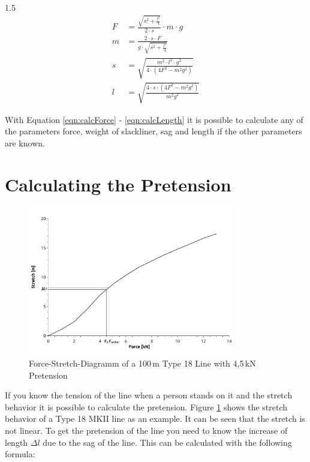 \begin{spreadlines}{1.5\baselineskip}
\begin{align}
	F &= \frac{\sqrt{s^2 + \frac{l^2}{4}}}{2\cdot s} \cdot m\cdot g \label{eqn:calcForce} \\
	m &= \frac{2\cdot s\cdot F}{g\cdot\sqrt{s^2 + \frac{l^2}{4}}} \label{eqn:calcWeight} \\
	s &= \sqrt{ \frac{m^2\cdot l^2\cdot g^2}{4\cdot(4F^2 - m^2g^2)} } \label{eqn:calSag} \\
	l &= \sqrt{ \frac{4\cdot s\cdot (4F^2 - m^2g^2)}{m^2g^2} } \label{eqn:calcLength} 
\end{align}
\end{spreadlines}

With Equation \ref{eqn:calcForce} - \ref{eqn:calcLength} it is possible to calculate any of the parameters force, weight of slackliner, sag and length if the other parameters are known.

\section{Calculating the Pretension}

\begin{figure}[htb] \centering
	\includegraphics[width=0.8\textwidth]{images/forceStretchDiagram.pdf}
	\caption{Force-Stretch-Diagramm of a 100\,m Type 18 Line with 4,5\,kN Pretension}
	\label{fig:forceStretchDiagramm}
\end{figure}

If you know the tension of the line when a person stands on it and the stretch behavior it is possible to calculate the pretension. Figure \ref{fig:forceStretchDiagramm} shows the stretch behavior of a Type 18 MKII line as an example. It can be seen that the stretch is not linear. To get the pretension of the line you need to know the increase of length $\Delta l$ due to the sag of the line. This can be calculated with the following formula:

